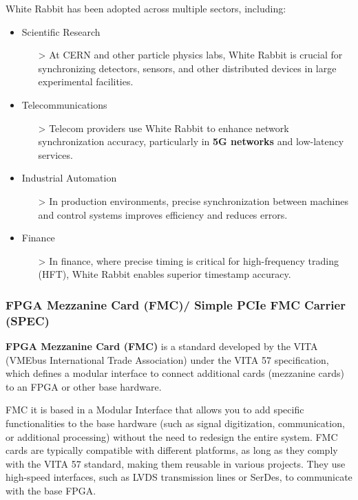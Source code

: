 \vspace{5 mm}

\noindent White Rabbit has been adopted across multiple sectors, including:

\begin{itemize}
\item Scientific Research
    \begin{itemize}
    \item[>] At CERN and other particle physics labs, White Rabbit is crucial for synchronizing detectors, sensors, and other distributed devices in large experimental facilities.
    \end{itemize}
\item Telecommunications
    \begin{itemize}
    \item[>] Telecom providers use White Rabbit to enhance network synchronization accuracy, particularly in \textbf{5G networks} and low-latency services.
    \end{itemize}
\item Industrial Automation
    \begin{itemize}
    \item[>] In production environments, precise synchronization between machines and control systems improves efficiency and reduces errors.
    \end{itemize}
\item Finance
    \begin{itemize}
    \item[>] In finance, where precise timing is critical for high-frequency trading (HFT), White Rabbit enables superior timestamp accuracy.
    \end{itemize}
\end{itemize}

\subsubsection{FPGA Mezzanine Card (FMC)/ Simple PCIe FMC Carrier (SPEC)}
\label{FMC-SPEC}

\textbf{FPGA Mezzanine Card (FMC)} is a standard developed by the VITA (VMEbus International Trade Association) under the VITA 57 specification, which defines a modular interface to connect additional cards (mezzanine cards) to an FPGA or other base hardware.

\vspace{5 mm}

\noindent FMC it is based in a Modular Interface that allows you to add specific functionalities to the base hardware (such as signal digitization, communication, or additional processing) without the need to redesign the entire system.
FMC cards are typically compatible with different platforms, as long as they comply with the VITA 57 standard, making them reusable in various projects.
They use high-speed interfaces, such as LVDS transmission lines or SerDes, to communicate with the base FPGA.


